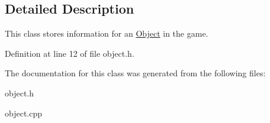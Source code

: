 \subsection{Detailed Description}
This class stores information for an \hyperlink{classObject}{Object} in the game. 

Definition at line 12 of file object.\+h.



The documentation for this class was generated from the following files\+:\begin{DoxyCompactItemize}
\item 
object.\+h\item 
object.\+cpp\end{DoxyCompactItemize}
